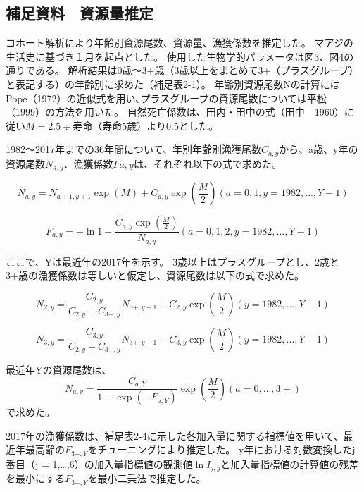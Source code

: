 \subsection{補足資料　資源量推定}
コホート解析により年齢別資源尾数、資源量、漁獲係数を推定した。
マアジの生活史に基づき１月を起点とした。
使用した生物学的パラメータは図3、図4の通りである。
解析結果は0歳～3+歳（3歳以上をまとめて3+（プラスグループ）と表記する）の年齢別に求めた（補足表2-1）。
年齢別資源尾数Nの計算にはPope（1972）の近似式を用い､プラスグループの資源尾数については平松（1999）の方法を用いた。
自然死亡係数は、田内・田中の式（田中　1960）に従い$M=2.5÷寿命（寿命5歳）$より0.5とした。

1982～2017年までの36年間について、年別年齢別漁獲尾数$C_{a,y}$から、a歳、y年の資源尾数$N_{a,y}$、漁獲係数$Fa,y$は、それぞれ以下の式で求めた。

\begin{equation}
 N_{a,y} = N_{a+1,y+1}\exp{(M)} + C_{a,y}\exp{\left(\frac{M}{2}\right)} (a=0,1, y=1982,…,Y-1)\label{eq:normalN}
\end{equation}

\begin{equation}
 F_{a,y} = -\ln{1-\frac{C_{a,y}\exp{\left(\frac{M}{2}\right)}}{N_{a,y}}} (a = 0, 1, 2, y = 1982, …, Y-1)\label{eq:F}
\end{equation}

 ここで、Yは最近年の2017年を示す。
 3歳以上はプラスグループとし、2歳と3+歳の漁獲係数は等しいと仮定し、資源尾数は以下の式で求めた。

\begin{equation}
 N_{2,y} = \frac{C_{2,y}}{C_{2,y}+ C_{3+,y}} N_{3+,y+1} + C_{2,y}\exp{\left(\frac{M}{2}\right)}(y=1982,…,Y-1)\label{eq:plus-1}
\end{equation} 

\begin{equation}
 N_{3,y} = \frac{C_{3,y}}{C_{2,y}+ C_{3+,y}} N_{3+,y+1} + C_{3,y}\exp{\left(\frac{M}{2}\right)}(y=1982,…,Y-1)\label{eq:plus-1}
\end{equation} 

最近年Yの資源尾数は、
\begin{equation}
 N_{a,y}=\frac{C_{a,Y}}{1-\exp{(-F_{a,Y})}} \exp{\left(\frac{M}{2}\right)} (a=0,…,3+)\label{eq:recent}
\end{equation}
で求めた。

2017年の漁獲係数は、補足表2-4に示した各加入量に関する指標値を用いて、最近年最高齢の$F_{3+,Y}$をチューニングにより推定した。
y年における対数変換したj番目（j = 1,…,6）の加入量指標値の観測値$\ln{I_{j,y}}$と加入量指標値の計算値の残差を最小にする$F_{3+,Y}$を最小二乗法で推定した。

